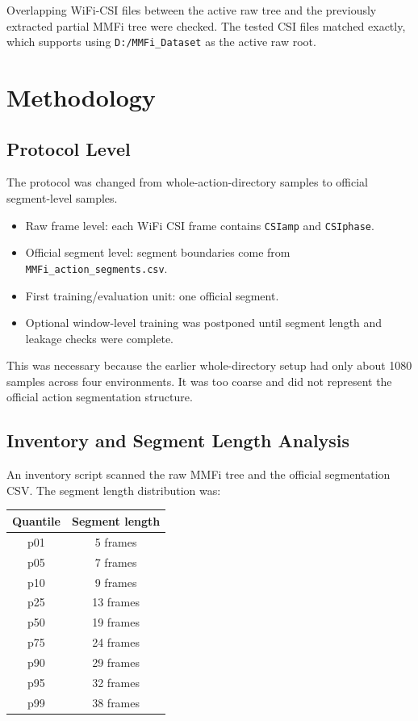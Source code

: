 \documentclass[11pt]{article}
\begin{document}
Overlapping WiFi-CSI files between the active raw tree and the previously extracted partial MMFi tree were checked. The tested CSI files matched exactly, which supports using \texttt{D:/MMFi\_Dataset} as the active raw root.

\section{Methodology}

\subsection{Protocol Level}

The protocol was changed from whole-action-directory samples to official segment-level samples.

\begin{itemize}
  \item Raw frame level: each WiFi CSI frame contains \texttt{CSIamp} and \texttt{CSIphase}.
  \item Official segment level: segment boundaries come from \texttt{MMFi\_action\_segments.csv}.
  \item First training/evaluation unit: one official segment.
  \item Optional window-level training was postponed until segment length and leakage checks were complete.
\end{itemize}

This was necessary because the earlier whole-directory setup had only about 1080 samples across four environments. It was too coarse and did not represent the official action segmentation structure.

\subsection{Inventory and Segment Length Analysis}

An inventory script scanned the raw MMFi tree and the official segmentation CSV. The segment length distribution was:

\begin{center}
\begin{tabular}{cc}
\toprule
Quantile & Segment length \\
\midrule
p01 & 5 frames \\
p05 & 7 frames \\
p10 & 9 frames \\
p25 & 13 frames \\
p50 & 19 frames \\
p75 & 24 frames \\
p90 & 29 frames \\
p95 & 32 frames \\
p99 & 38 frames \\
\bottomrule
\end{tabular}
\end{center}
\end{document}
